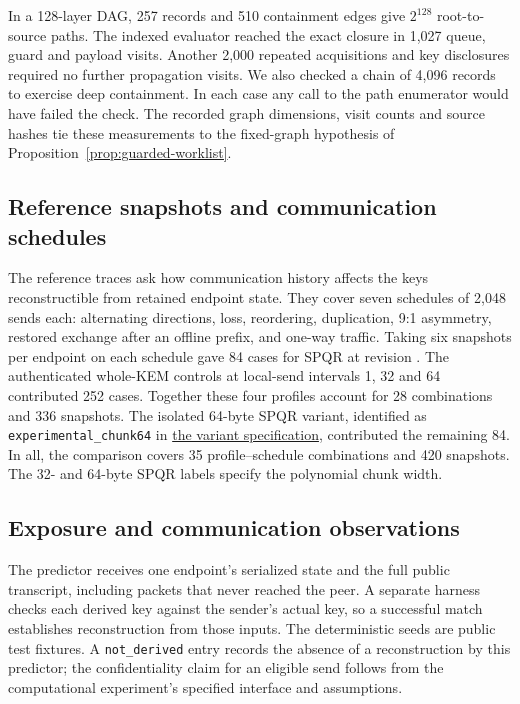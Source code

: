 In a 128-layer DAG, 257 records and 510 containment edges give
$2^{128}$ root-to-source paths. The indexed evaluator reached the
exact closure in 1,027 queue, guard and payload visits. Another 2,000
repeated acquisitions and key disclosures required no further
propagation visits. We also checked a chain of 4,096 records to
exercise deep containment. In each case any call to the path
enumerator would have failed the check. The recorded graph dimensions,
visit counts and source hashes tie these measurements to the
fixed-graph hypothesis of Proposition~\ref{prop:guarded-worklist}.

\subsection{Reference snapshots and communication schedules}

The reference traces ask how communication history affects the keys
reconstructible from retained endpoint state. They cover seven schedules
of 2,048 sends each: alternating directions, loss, reordering,
duplication, 9:1 asymmetry, restored exchange after an offline prefix,
and one-way traffic. Taking six snapshots per endpoint on each schedule gave 84
cases for SPQR at revision
. The authenticated
whole-KEM controls at local-send intervals 1, 32 and 64 contributed
252 cases. Together these four profiles account for 28 combinations
and 336 snapshots. The isolated 64-byte SPQR variant, identified as
\texttt{experimental\_chunk64} in
\href{https://github.com/billlza/q-periapt/blob/228c944fc476e3e57d6c08063cacb19bca5b360e/research/continuity-spqr-reference/variants/README.md}{the variant specification},
contributed the remaining 84. In all, the comparison covers
35 profile--schedule combinations and 420 snapshots. The 32- and
64-byte SPQR labels specify the polynomial chunk width.

\subsection{Exposure and communication observations}


The predictor receives one endpoint's serialized state and the full
public transcript, including packets that never reached the peer. A
separate harness checks each derived key against the sender's actual key,
so a successful match establishes reconstruction from those inputs. The
deterministic seeds are public test fixtures. A \texttt{not\_derived}
entry records the absence of a reconstruction by this predictor; the
confidentiality claim for an eligible send follows from the computational
experiment's specified interface and assumptions.

